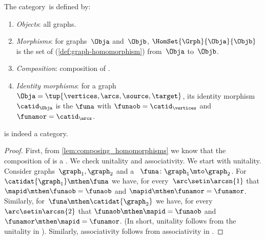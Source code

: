 \begin{ctdefinition}
    \label{def:Grph}
    The category~\Grph is defined by:
    \begin{enumerate}
        \item \emph{Objects}: all graphs.
        \item \emph{Morphisms}: for graphs~$\Obja$ and~$\Objb$, $\HomSet{\Grph}{\Obja}{\Objb}$ is the set of  (\cref{def:graph-homomorphism}) from~$\Obja$ to~$\Objb$.
        \item \emph{Composition}: composition of .
        \item \emph{Identity morphisms}: for a graph~$\Obja =\tup{\vertices,\arcs,\source,\target}$,
              its identity morphism $\catid_\Obja$ is the  $\funa$ with $\funaob = \catid_{\vertices}$ and $\funamor= \catid_{\arcs}$.
    \end{enumerate}
\end{ctdefinition}

\begin{lemma}\label{lem:Grph-is-cat}
    \Grph is indeed a category.
\end{lemma}

\begin{proof}
    First, from \cref{lem:composing_homomorphisms} we know that the composition of  is a .
    We check unitality and associativity.
    We start with unitality.
    Consider graphs~$\graph_1,\graph_2$ and a ~$\funa\colon \graph_1\mto \graph_2$.
    For~$\catidat{\graph_1}\mthen \funa$ we have, for every~$\arc \setin \arcsn{1}$ that $\mapid\mthen \funaob=\funaob$ and $\mapid\mthen \funamor=\funamor$.
    Similarly, for~$\funa \mthen \catidat{\graph_2}$ we have, for every $\arc \setin \arcsn{2}$ that $\funaob\mthen \mapid=\funaob$ and $\funamor \mthen \mapid=\funamor$.
    (In short, unitality follows from the unitality in \Set).
    Similarly, associativity follows from associativity in \Set.
\end{proof}
